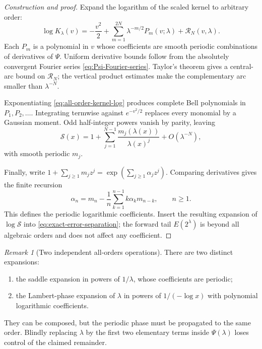 \documentclass[11pt,oneside]{article}
\theoremstyle{definition}
\theoremstyle{remark}
\newtheorem{remark}[theorem]{Remark}
\newcommand{\Lam}{\lambda}
\newcommand{\PsiPer}{\Psi}
\begin{document}
\begin{proof}[Construction and proof]
Expand the logarithm of the scaled kernel to arbitrary order:
\begin{equation}\label{eq:all-order-kernel-log}
 \log K_\Lam(v)=-\frac{v^2}{2}
 +\sum_{m=1}^{2N}\Lam^{-m/2}P_m(v;\Lam)
 +\mathcal R_N(v,\Lam).
\end{equation}
Each $P_m$ is a polynomial in $v$ whose coefficients are smooth periodic
combinations of derivatives of $\PsiPer$.  Uniform derivative bounds follow from
the absolutely convergent Fourier series \eqref{eq:Psi-Fourier-series}.  Taylor's
theorem gives a central-arc bound on $\mathcal R_N$; the vertical product estimates
make the complementary arc smaller than $\Lam^{-N}$.

Exponentiating \eqref{eq:all-order-kernel-log} produces complete Bell polynomials
in $P_1,P_2,\ldots$.  Integrating termwise against $e^{-v^2/2}$ replaces every
monomial by a Gaussian moment.  Odd half-integer powers vanish by parity, leaving
\begin{equation}\label{eq:mass-full-expansion}
  \mathcal S(x)=1+\sum_{j=1}^{N-1}
  \frac{m_j(\Lam(x))}{\Lam(x)^j}+O(\Lam^{-N}),
\end{equation}
with smooth periodic $m_j$.

Finally, write
$1+\sum_{j\ge1}m_jz^j=\exp(\sum_{j\ge1}\alpha_jz^j)$.  Comparing derivatives
gives the finite recursion
\begin{equation}\label{eq:log-coefficient-recursion}
  \alpha_n=m_n-\frac1n\sum_{k=1}^{n-1}
  k\alpha_km_{n-k},\qquad n\ge1.
\end{equation}
This defines the periodic logarithmic coefficients.  Insert the resulting expansion
of $\log\mathcal S$ into \eqref{eq:exact-error-separation}; the forward tail
$E(2^\Lam)$ is beyond all algebraic orders and does not affect any coefficient.
\end{proof}

\begin{remark}[Two independent all-orders operations]
There are two distinct expansions:
\begin{enumerate}
\item the saddle expansion in powers of $1/\Lam$, whose coefficients are periodic;
\item the Lambert-phase expansion of $\Lam$ in powers of $1/(-\log x)$ with
      polynomial logarithmic coefficients.
\end{enumerate}
They can be composed, but the periodic phase must be propagated to the same order.
Blindly replacing $\Lam$ by the first two elementary terms inside $\PsiPer(\Lam)$
loses control of the claimed remainder.
\end{remark}
\end{document}
